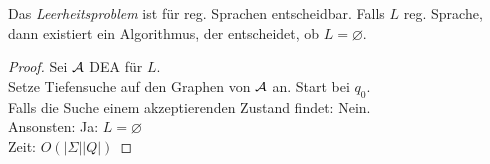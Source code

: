 \begin{Satz}[name={[Leerheitsproblem]}]\label{satz:leerheitsproblem}
        Das \emph{Leerheitsproblem} ist für reg. Sprachen entscheidbar.
        Falls $L$ reg. Sprache, dann existiert ein Algorithmus, der entscheidet, ob $L=\varnothing$.
\end{Satz}
\begin{proof}
	Sei $\mathcal{A}$ \ac{DEA} für $L$.\\
	Setze Tiefensuche auf den Graphen von $\mathcal{A}$ an. Start bei $q_0$.\\
	Falls die Suche einem akzeptierenden Zustand findet: Nein.\\
	Ansonsten: Ja: $L=\varnothing$\\
	Zeit: $O(|\Sigma||Q|)$
\end{proof}

